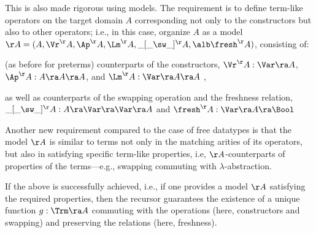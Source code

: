 This %
is also made rigorous using models. 
The requirement is 
to define term-like operators 
on the target domain $A$ corresponding 
not only to the constructors but also to other operators; 
i.e., in this case, organize $A$ as a model $\AA = (A,\Vr^\AA,\Ap^\AA,\Lm^\AA,\_[\_\sw \_]^\AA,\alb\fresh^\AA)$, consisting of: 
\begin{mmyitem}
	\item (as before for preterms) counterparts of the constructors,  $\Vr^\AA : \Var \ra A$, $\Ap^\AA : A \ra A \ra A$, 
	and $\Lm^\AA : \Var \ra A \ra A$ , 
	\item as well as counterparts of the swapping operation and the freshness relation, $\_[\_\sw \_]^\AA : A \ra \Var \ra \Var \ra A$ and 
	$\fresh^\AA : \Var \ra A \ra \Bool$
\end{mmyitem}
%
Another new requirement compared to the case of free datatypes is that 
the model $\AA$ is similar to terms not only %
in the matching arities of its operators, %
but also in %
%
satisfying %
specific term-like properties, i.e, $\AA$-counterparts of properties %
of the terms---e.g., swapping commuting with  
$\lambda$-abstraction. %

If the above is successfully achieved, i.e., if one provides 
a model $\AA$ satisfying the required properties, %
then the recursor guarantees the existence of a unique function $g: \Trm \ra A$ commuting with the operations (here, constructors and swapping) and preserving the relations (here, freshness).
%


